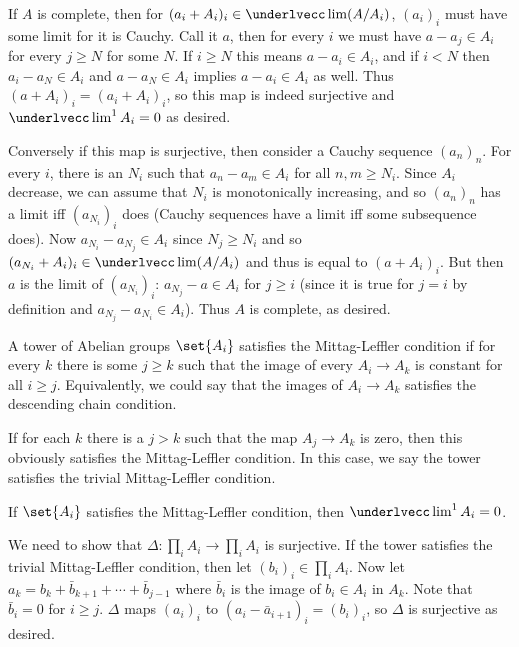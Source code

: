     If $A$ is complete, then for $(a_i+A_i)_i\in\ilim(A/A_i)$, $(a_i)_i$ must have some limit for it is Cauchy.
    Call it $a$, then for every $i$ we must have $a-a_j\in A_i$ for every $j\geq N$ for some $N$.
    If $i\geq N$ this means $a-a_i\in A_i$, and if $i<N$ then $a_i-a_N\in A_i$ and $a-a_N\in A_i$ implies $a-a_i\in A_i$ as well.
    Thus $(a+A_i)_i=(a_i+A_i)_i$, so this map is indeed surjective and $\ilim^1A_i=0$ as desired.

    Conversely if this map is surjective, then consider a Cauchy sequence $(a_n)_n$.
    For every $i$, there is an $N_i$ such that $a_n-a_m\in A_i$ for all $n,m\geq N_i$.
    Since $A_i$ decrease, we can assume that $N_i$ is monotonically increasing, and so $(a_n)_n$ has a limit iff $(a_{N_i})_i$ does (Cauchy sequences have a limit
    iff some subsequence does).
    Now $a_{N_i}-a_{N_j}\in A_i$ since $N_j\geq N_i$ and so $(a_{N_i}+A_i)_i\in\ilim(A/A_i)$ and thus is equal to $(a+A_i)_i$.
    But then $a$ is the limit of $(a_{N_i})_i$: $a_{N_j}-a\in A_i$ for $j\geq i$ (since it is true for $j=i$ by definition and $a_{N_j}-a_{N_i}\in A_i$).
    Thus $A$ is complete, as desired.

\eexam

\bdefn

    A tower of Abelian groups $\set{A_i}$ satisfies the {\emphcolor Mittag-Leffler condition} if for every $k$ there is some $j\geq k$ such that the image
    of every $A_i\to A_k$ is constant for all $i\geq j$.
    Equivalently, we could say that the images of $A_i\to A_k$ satisfies the descending chain condition.

    If for each $k$ there is a $j>k$ such that the map $A_j\to A_k$ is zero, then this obviously satisfies the Mittag-Leffler condition.
    In this case, we say the tower satisfies the {\emphcolor trivial Mittag-Leffler condition}.

\edefn

\bprop

    If $\set{A_i}$ satisfies the Mittag-Leffler condition, then $\ilim^1A_i=0$.

\eprop

\bproof

    We need to show that $\Delta\colon\prod_iA_i\to\prod_iA_i$ is surjective.
    If the tower satisfies the trivial Mittag-Leffler condition, then let $(b_i)_i\in\prod_iA_i$.
    Now let $a_k=b_k+\bar b_{k+1}+\cdots+\bar b_{j-1}$ where $\bar b_i$ is the image of $b_i\in A_i$ in $A_k$.
    Note that $\bar b_i=0$ for $i\geq j$.
    $\Delta$ maps $(a_i)_i$ to $(a_i-\bar a_{i+1})_i=(b_i)_i$, so $\Delta$ is surjective as desired.

